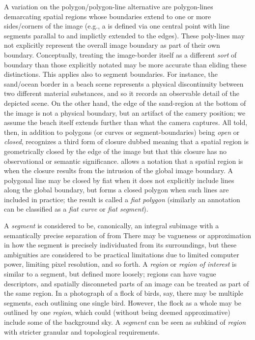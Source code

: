 {\begin{description}
A variation on the polygon/polygon-line alternative 
are polygon-lines demarcating spatial regions 
whose boundaries extend to one or more sides/corners 
of the image (e.g., a  is defined 
via one central point with line segments 
parallal to and implictly 
extended to the edges).  These poly-lines 
may not explicitly represent the overall image 
boundary as part of their own boundary.  
Conceptually, treating the image-border itself 
as a different \textit{sort} of boundary than 
those explicitly notated may be more accurate 
than eliding these distinctions.  This 
applies also to segment boundaries.  For instance, 
the sand/ocean border in a beach scene represents 
a physical discontinuity between two different 
material substances, and so it records an 
observable detail of the depicted scene.  
On the other hand, the edge of the sand-region 
at the bottom of the image is not a physical 
boundary, but an artifact of the camery position; 
we assume the beach itself extends further than 
what the camera captures.  All told, then, 
in addition to polygons (or curves or segment-boundaries) 
being \textit{open} or \textit{closed}, \AXFI{} 
recognizes a third form of closure dubbed 
 meaning that a spatial region is 
geometrically closed by the edge of the image but 
that this closure has no observational or semantic 
significance.  \lAXFI{} allows a notation that 
a spatial region is  when the closure 
results from the intrusion of the global image boundary.  
A polygonal line may be closed by fiat when it does 
not explicitly include lines along the global boundary, 
but forms a closed polygon when such lines are 
included in practice; the result is called a 
\textit{fiat polygon} (similarly an annotation 
can be classified as a \textit{fiat curve} or 
\textit{fiat segment}).
   

\item[Segments and Regions]  A \textit{segment} is 
considered to be, canonically, an integral 
subimage with a semantically precise 
separation of  from   
There may be vagueness or approximation 
in how the segment is precisely individuated 
from its surroundings, but these ambiguities 
are considered to be practical limitations 
due to limited computer power, limiting pixel 
resolution, and so forth.  A \textit{region} 
or \textit{region of interest} is similar to a 
segment, but defined more loosely; regions 
can have vague descriptors, and spatially 
disconneted parts of an image can be treated 
as part of the same region.  In a photograph 
of a flock of birds, say, there may be 
multiple segments, each outlining one single bird.  
However, the flock as a whole may be outlined 
by one \textit{region}, which could (without 
being deemed approximative) include some of the 
background sky.  A \textit{segment} can be seen 
as subkind of \textit{region} with stricter 
granular and topological requirements. 


\end{description}}
